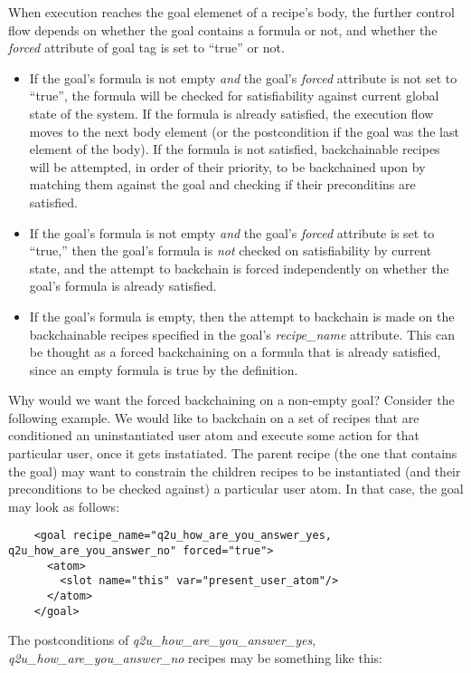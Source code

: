 When execution reaches the goal elemenet of a recipe's body, the further control flow depends on whether the goal contains a formula or not, and whether the \textsl{forced} attribute of goal tag is set to ``true'' or not. 
\begin{itemize}
\item If the goal's formula is not empty \textit{and} the goal's \textsl{forced} attribute is not set to ``true'', the formula will be checked for satisfiability against current global state of the system. If the formula is already satisfied, the execution flow moves to the next body element (or the postcondition if the goal was the last element of the body). If the formula is not satisfied, backchainable recipes will be attempted, in order of their priority, to be backchained upon by matching them against the goal and checking if their preconditins are satisfied.
\item If the goal's formula is not empty \textit{and} the goal's \textsl{forced} attribute is set to ``true,'' then the goal's formula is \textit{not} checked on satisfiability by current state, and the attempt to backchain is forced independently on whether the goal's formula is already satisfied.
\item If the goal's formula is empty, then the attempt to backchain is made on the backchainable recipes specified in the goal's \textsl{recipe\_name} attribute. This can be thought as a forced backchaining on a formula that is already satisfied, since an empty formula is true by the definition.
\end{itemize}

Why would we want the forced backchaining on a non-empty goal? Consider the following example. We would like to backchain on a set of recipes that are conditioned an uninstantiated user atom and execute some action for that particular user, once it gets instatiated. The parent recipe (the one that contains the goal) may want to constrain the children recipes to be instantiated (and their preconditions to be checked against) a particular user atom. In that case, the goal may look as follows: 

\lstset{language=XML}
\begin{lstlisting}
    <goal recipe_name="q2u_how_are_you_answer_yes, q2u_how_are_you_answer_no" forced="true">
      <atom>
        <slot name="this" var="present_user_atom"/>
      </atom>
    </goal>
\end{lstlisting}

The postconditions of \textsl{q2u\_how\_are\_you\_answer\_yes}, \textsl{q2u\_how\_are\_you\_answer\_no} recipes may be something like this:

